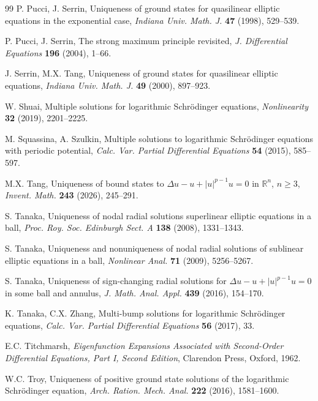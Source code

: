 \documentclass[11pt]{article}
\begin{document}
\begin{thebibliography}{99}
 P. Pucci, J. Serrin,
Uniqueness of ground states for quasilinear elliptic equations in the exponential case,
\emph{Indiana Univ. Math. J.} \textbf{47} (1998), 529--539.

 P. Pucci, J. Serrin,
The strong maximum principle revisited,
\emph{J. Differential Equations} \textbf{196} (2004), 1--66.

 J. Serrin, M.X. Tang,
Uniqueness of ground states for quasilinear elliptic equations,
\emph{Indiana Univ. Math. J.} \textbf{49} (2000), 897--923.

 W. Shuai,
Multiple solutions for logarithmic Schr\"odinger equations,
\emph{Nonlinearity} \textbf{32} (2019), 2201--2225.


 M. Squassina, A. Szulkin,
Multiple solutions to logarithmic Schr\"odinger equations with periodic potential,
\emph{Calc. Var. Partial Differential Equations} \textbf{54} (2015), 585--597.

 M.X. Tang,
Uniqueness of bound states to $\Delta u-u+|u|^{p-1}u=0$ in $\mathbb R^n$, $n\ge3$,
\emph{Invent. Math.} \textbf{243} (2026), 245--291.

 S. Tanaka,
Uniqueness of nodal radial solutions superlinear elliptic equations in a
ball,
\emph{Proc. Roy. Soc. Edinburgh Sect. A} \textbf{138} (2008), 1331--1343.

 S. Tanaka,
Uniqueness and nonuniqueness of nodal radial solutions of sublinear elliptic
equations in a ball,
\emph{Nonlinear Anal.} \textbf{71} (2009), 5256--5267.

 S. Tanaka,
Uniqueness of sign-changing radial solutions for $\Delta u-u+|u|^{p-1}u=0$ in some ball and annulus,
\emph{J. Math. Anal. Appl.} \textbf{439} (2016), 154--170.

 K. Tanaka, C.X. Zhang,
Multi-bump solutions for logarithmic Schr\"odinger equations,
\emph{Calc. Var. Partial Differential Equations} \textbf{56} (2017), 33.

 E.C. Titchmarsh,
\emph{Eigenfunction Expansions Associated with Second-Order Differential Equations, Part I,
Second Edition}, Clarendon Press, Oxford, 1962.

 W.C. Troy,
Uniqueness of positive ground state solutions of the logarithmic Schr\"odinger equation,
\emph{Arch. Ration. Mech. Anal.} \textbf{222} (2016), 1581--1600.


\end{thebibliography}
\end{document}
